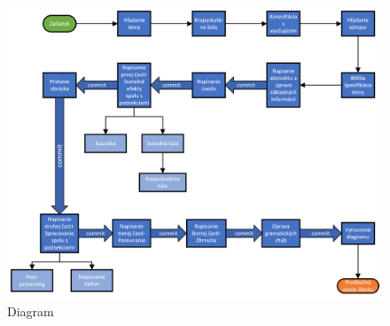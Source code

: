 \documentclass[10pt,twoside,slovak,a4paper]{article}
\begin{document}




\begin{figure}
    \centering
    \includegraphics[scale=0.8]{Kresba1.png}
    \caption{Diagram}
    \label{dia}
\end{figure}
\end{document}
